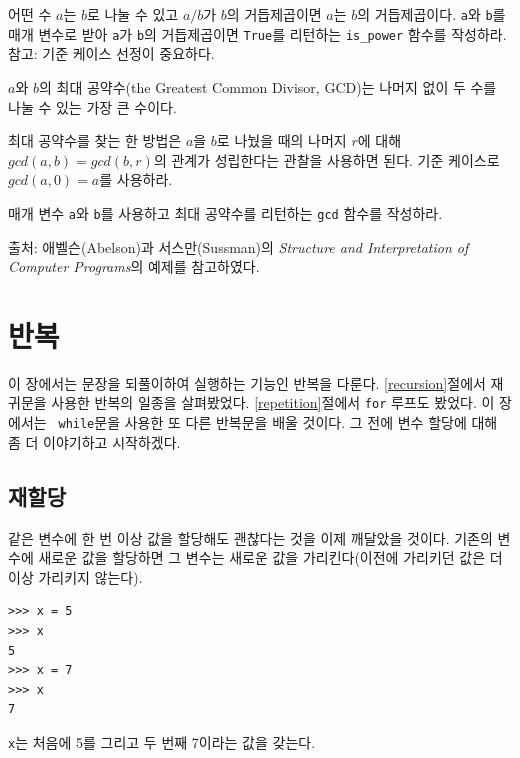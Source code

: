 \documentclass[10pt]{book}
\begin{document}
\begin{exercise}

  어떤 수 $a$는 $b$로 나눌 수 있고 $a/b$가 $b$의 거듭제곱이면 $a$는
  $b$의 거듭제곱이다. {\tt a}와 {\tt b}를 매개 변수로 받아 {\tt a}가
  {\tt b}의 거듭제곱이면 {\tt True}를 리턴하는 \verb"is_power" 함수를
  작성하라.  참고: 기준 케이스 선정이 중요하다.


\end{exercise}


\begin{exercise}

$a$와 $b$의 최대 공약수(the Greatest Common Divisor, GCD)는 나머지 없이
두 수를 나눌 수 있는 가장 큰 수이다.

최대 공약수를 찾는 한 방법은 $a$을 $b$로 나눴을 때의 나머지 $r$에 대해
$gcd(a, b) = gcd(b, r)$의 관계가 성립한다는 관찰을 사용하면 된다.  기준
케이스로 $gcd(a, 0) = a$를 사용하라.

매개 변수 {\tt a}와 {\tt b}를 사용하고 최대 공약수를 리턴하는
\verb"gcd" 함수를 작성하라.


출처: 애벨슨(Abelson)과 서스만(Sussman)의 {\em Structure and
  Interpretation of Computer Programs}의 예제를 참고하였다.

\end{exercise}


\chapter{반복}

이 장에서는 문장을 되풀이하여 실행하는 기능인 반복을 다룬다.
\ref{recursion}절에서 재귀문을 사용한 반복의 일종을 살펴봤었다.
\ref{repetition}절에서 {\tt for} 루프도 봤었다.  이 장에서는 {\tt
  while}문을 사용한 또 다른 반복문을 배울 것이다.  그 전에 변수 할당에
대해 좀 더 이야기하고 시작하겠다.


\section{재할당}

같은 변수에 한 번 이상 값을 할당해도 괜찮다는 것을 이제 깨달았을
것이다.  기존의 변수에 새로운 값을 할당하면 그 변수는 새로운 값을
가리킨다(이전에 가리키던 값은 더 이상 가리키지 않는다).



\begin{verbatim}
>>> x = 5
>>> x
5
>>> x = 7
>>> x
7
\end{verbatim}
%
{\tt x}는 처음에 5를 그리고 두 번째 7이라는 값을 갖는다.
\end{document}
